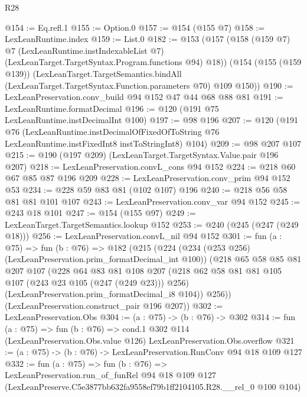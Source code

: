 \begin{lexlean}{R28}
\begin{coremodule}
@154 := Eq.refl.{1}
@155 := Option.{0}
@157 := @154 (@155 @7)
@158 := LexLeanRuntime.index
@159 := List.{0}
@182 := @153
    (@157
      (@158
        (@159 @7)
        @7
        (LexLeanRuntime.instIndexableList @7)
        (LexLeanTarget.TargetSyntax.Program.functions @94)
        @18))
    (@154
      (@155 (@159 @139))
      (LexLeanTarget.TargetSemantics.bindAll
        (LexLeanTarget.TargetSyntax.Function.parameters @70)
        @109
        @150))
@190 := LexLeanPreservation.conv_build @94 @152 @47 @44 @68 @88 @81
@191 := LexLeanRuntime.formatDecimal
@196 := @120 (@191 @75 LexLeanRuntime.instDecimalInt @100)
@197 := @98 @196
@207 := @120
    (@191
      @76
      (LexLeanRuntime.instDecimalOfFixedOfToString
        @76
        LexLeanRuntime.instFixedInt8
        instToStringInt8)
      @104)
@209 := @98 @207 @107
@215 := @190 (@197 @209) (LexLeanTarget.TargetSyntax.Value.pair @196 @207)
@218 := LexLeanPreservation.convL_cons @94 @152
@224 := @218 @60 @67 @85 @87 @196 @209
@228 := LexLeanPreservation.conv_prim @94 @152 @53
@234 := @228 @59 @83 @81 (@102 @107) @196
@240 := @218 @56 @58 @81 @81 @101 @107
@243 := LexLeanPreservation.conv_var @94 @152
@245 := @243 @18 @101
@247 := @154 (@155 @97)
@249 := LexLeanTarget.TargetSemantics.lookup @152
@253 := @240 (@245 (@247 (@249 @18)))
@256 := LexLeanPreservation.convL_nil @94 @152
@301 := fun (a : @75) =>
  fun (b : @76) =>
  @182
    (@215
      (@224
        (@234 (@253 @256) (LexLeanPreservation.prim_formatDecimal_int @100))
        (@218
          @65
          @58
          @85
          @81
          @207
          @107
          (@228
            @64
            @83
            @81
            @108
            @207
            (@218 @62 @58 @81 @81 @105 @107 (@243 @23 @105 (@247 (@249 @23))) @256)
            (LexLeanPreservation.prim_formatDecimal_i8 @104))
          @256))
      (LexLeanPreservation.construct_pair @196 @207))
@302 := LexLeanPreservation.Obs
@304 := (a : @75) -> (b : @76) -> @302
@314 := fun (a : @75) =>
  fun (b : @76) =>
  cond.{1} @302 @114 (LexLeanPreservation.Obs.value @126) LexLeanPreservation.Obs.overflow
@321 := (a : @75) -> (b : @76) -> LexLeanPreservation.RunConv @94 @18 @109 @127
@332 := fun (a : @75) =>
  fun (b : @76) =>
  LexLeanPreservation.run_of_funRel
    @94
    @18
    @109
    @127
    (LexLeanPreserve.C5e3877bb632fa9558ef79b1ff2104105.R28.__rel_0 @100 @104)
\end{coremodule}
\end{lexlean}
